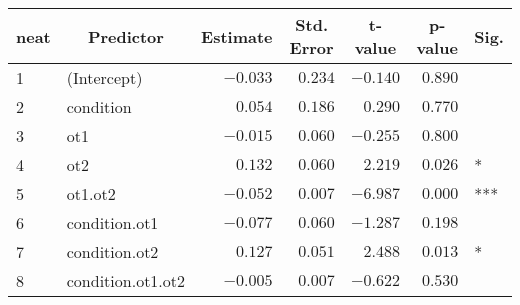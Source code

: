 \begin{table}[!tbp]
\begin{center}
\begin{tabular}{llrrrrl}
\hline\hline
\multicolumn{1}{l}{neat}&\multicolumn{1}{c}{Predictor}&\multicolumn{1}{c}{Estimate}&\multicolumn{1}{c}{Std. Error}&\multicolumn{1}{c}{t-value}&\multicolumn{1}{c}{p-value}&\multicolumn{1}{c}{Sig.}\tabularnewline
\hline
1&(Intercept)&$-0.033$&$0.234$&$-0.140$&$0.890$& \tabularnewline
2&condition&$ 0.054$&$0.186$&$ 0.290$&$0.770$& \tabularnewline
3&ot1&$-0.015$&$0.060$&$-0.255$&$0.800$& \tabularnewline
4&ot2&$ 0.132$&$0.060$&$ 2.219$&$0.026$&*\tabularnewline
5&ot1.ot2&$-0.052$&$0.007$&$-6.987$&$0.000$&***\tabularnewline
6&condition.ot1&$-0.077$&$0.060$&$-1.287$&$0.198$& \tabularnewline
7&condition.ot2&$ 0.127$&$0.051$&$ 2.488$&$0.013$&*\tabularnewline
8&condition.ot1.ot2&$-0.005$&$0.007$&$-0.622$&$0.530$& \tabularnewline
\hline
\end{tabular}\end{center}
\end{table}
